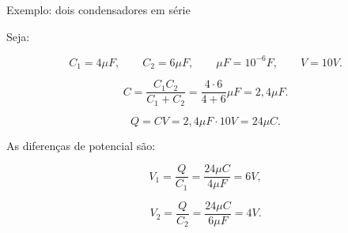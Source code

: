 \documentclass{beamer}
\begin{document}
	
	\begin{frame}{Exemplo: dois condensadores em série}
		\scriptsize
		
		Seja:
		
		\[
		C_1=4\mu F,
		\qquad
		C_2=6\mu F,
		\qquad
		\mu F=10^{-6}F,
		\qquad
		V=10V.
		\]
		
		\[
		C=
		\frac{C_1C_2}{C_1+C_2}
		=
		\frac{4\cdot 6}{4+6}\mu F
		=
		2,4\mu F.
		\]
		
		\[
		Q=CV
		=
		2,4\mu F\cdot 10V
		=
		24\mu C.
		\]
		
		As diferenças de potencial são:
		
		\[
		V_1=\frac{Q}{C_1}
		=
		\frac{24\mu C}{4\mu F}
		=
		6V,
		\]
		
		\[
		V_2=\frac{Q}{C_2}
		=
		\frac{24\mu C}{6\mu F}
		=
		4V.
		\]
	\end{frame}
	
\end{document}
